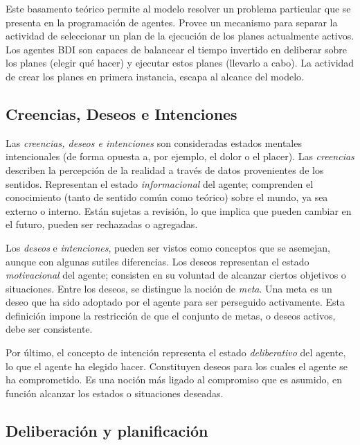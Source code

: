  Este basamento teórico permite al modelo resolver un problema
 particular que  se presenta en la programación de agentes.
 Provee un mecanismo para separar la  actividad de seleccionar un plan
 de la ejecución de los planes actualmente activos.
 Los agentes BDI son capaces de balancear el tiempo invertido en
 deliberar sobre los planes (elegir qué hacer) y ejecutar estos planes
 (llevarlo a cabo).
 La actividad  de crear los planes en primera instancia, escapa al
 alcance del modelo.

\subsection{Creencias, Deseos e Intenciones}
 \label{sub:creencia_deseos_intenciones}
 
 Las \textit{creencias, deseos e intenciones} son consideradas estados
 mentales  intencionales (de forma opuesta a, por ejemplo, el dolor o
 el placer).
 Las \textit{creencias}  describen la percepción de la realidad a
 través de datos provenientes de  los sentidos.
 Representan el estado \textit{informacional} del agente; comprenden el
 conocimiento (tanto de sentido común como teórico) sobre el mundo, ya
 sea  externo o interno.
 Están sujetas a revisión, lo que implica que pueden  cambiar en el
 futuro, pueden ser rechazadas o agregadas.
 
 Los \textit{deseos} e \textit{intenciones}, pueden ser vistos como
 conceptos que  se asemejan, aunque con algunas sutiles diferencias.
 Los deseos representan el  estado \textit{motivacional} del agente;
 consisten en su voluntad de alcanzar  ciertos objetivos o situaciones.
 Entre los deseos, se distingue la noción de  \textit{meta}.
 Una meta es un deseo que ha sido adoptado por el agente para  ser
 perseguido activamente.
 Esta definición impone la restricción de que el  conjunto de metas, o
 deseos activos, debe ser consistente.
 
 Por último, el concepto de intención representa el estado
 \textit{deliberativo} del agente, lo que el agente ha elegido hacer.
 Constituyen deseos para los cuales el agente se ha comprometido.
 Es una noción más ligado al compromiso que es  asumido, en función
 alcanzar los estados o situaciones deseadas.

\subsection{Deliberación y planificación}
 \label{sub:deliberacion_planificacion}
 

